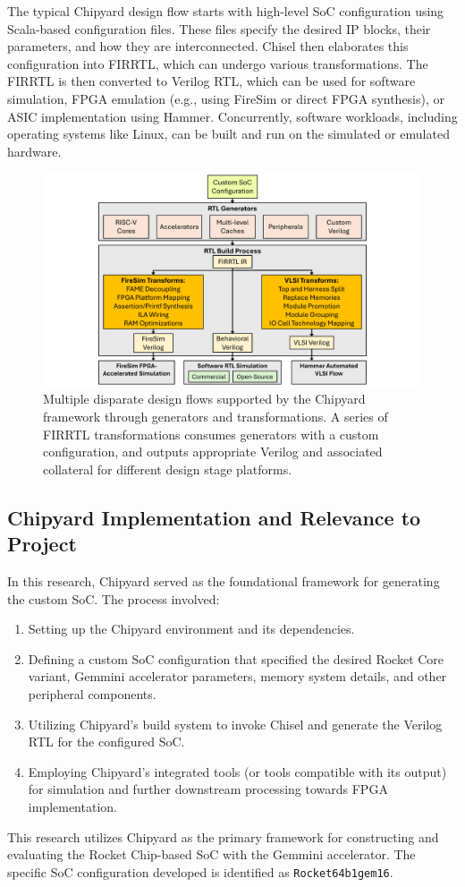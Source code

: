 The typical Chipyard design flow starts with high-level SoC configuration using Scala-based configuration files. These files specify the desired IP blocks, their parameters, and how they are interconnected. Chisel then elaborates this configuration into FIRRTL, which can undergo various transformations. The FIRRTL is then converted to Verilog RTL, which can be used for software simulation, FPGA emulation (e.g., using FireSim or direct FPGA synthesis), or ASIC implementation using Hammer. Concurrently, software workloads, including operating systems like Linux, can be built and run on the simulated or emulated hardware.

\begin{figure}[htbp]
    \centering
    \includegraphics[width=0.75\linewidth]{Images/02_Chipyard_ChipyardFlow.pdf}
    \caption{Multiple disparate design flows supported by the Chipyard framework through generators and transformations. A series of FIRRTL transformations consumes generators with a custom configuration, and outputs appropriate Verilog and associated collateral for different design stage platforms.}
    \label{fig:chipyard_flow}
\end{figure}

\subsection{Chipyard Implementation and Relevance to Project}
\label{sec:chipyard_implementation}
In this research, Chipyard served as the foundational framework for generating the custom SoC. The process involved:
\begin{enumerate}
    \item Setting up the Chipyard environment and its dependencies.
    \item Defining a custom SoC configuration that specified the desired Rocket Core variant, Gemmini accelerator parameters, memory system details, and other peripheral components.
    \item Utilizing Chipyard's build system to invoke Chisel and generate the Verilog RTL for the configured SoC.
    \item Employing Chipyard's integrated tools (or tools compatible with its output) for simulation and further downstream processing towards FPGA implementation.
\end{enumerate}
This research utilizes Chipyard as the primary framework for constructing and evaluating the Rocket Chip-based SoC with the Gemmini accelerator. The specific SoC configuration developed is identified as \texttt{Rocket64b1gem16}.

